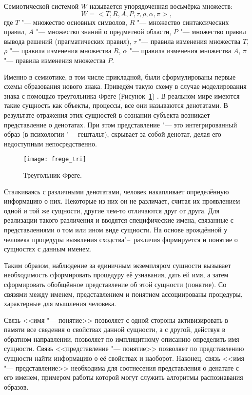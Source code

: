 \begin{Def}
	Семиотической системой $W$ называется упорядоченная восьмёрка множеств:
	\begin{equation}
		W=<T,R,A,P,\tau,\rho,\alpha,\pi>,
	\end{equation} 
	где	$T$ "--- множество основных символов, $R$ "--- множество синтаксических правил, $A$ "--- множество знаний о предметной области, $P$ "--- множество правил вывода решений (прагматических правил), $\tau$ "--- правила изменения множества $T$, $\rho$ "--- правила изменения множества $R$, $\alpha$ "--- правила изменения множества $A$, $\pi$ "--- правила изменения множества $P$.
\end{Def}

Именно в семиотике, в том числе прикладной, были сформулированы первые схемы образования нового знака. Приведём такую схему в случае моделирования знака с помощью треугольника Фреге (Рисунок~\ref{fg:frege_sign}) \cite{Frege2000,Pirs2000}. В реальном мире имеются такие сущность как объекты, процессы, все они называются денотатами. В результате отражения этих сущностей в сознании субъекта возникает представление о денотатах. При этом представление "--- это интегрированный образ (в психологии "--- гештальт), скрывает за собой денотат, делая его недоступным непосредственно.

\begin{figure}[h]
	\centering
	\texttt{[image: frege\_tri]}
	\caption{Треугольник Фреге.}
	\label{fg:frege_sign}
\end{figure}

Сталкиваясь с различными денотатами, человек накапливает определённую информацию о них. Некоторые из них он не различает, считая их проявлением одной и той же сущности, другие чем-то отличаются друг от друга. Для реализации такого различения и вводятся специфические имена, связанные с представлениями о том или ином виде сущности. На основе врождённой у человека процедуры выявления сходства"--~различия формируется и понятие о сущностях с данным именем.

Таким образом, наблюдение за единичным экземпляром сущности вызывает необходимость сформировать процедуру её узнавания, дать ей имя, а затем сформировать обобщённое представление об этой сущности (понятие). Со связями между именем, представлением и понятием ассоциированы процедуры, характерные для мышления человека.

Связь <<имя "--- понятие>> позволяет с одной стороны активизировать в памяти все сведения о свойствах данной сущности, а с другой, действуя в обратном направлении, позволяет по имплицитному описанию определить имя сущности. Связь <<представление "--- понятие>> позволяет по представлению сущности найти информацию о её свойствах и наоборот. Наконец, связь <<имя "--- представление>> необходима для соотнесения представления о денатате с его именем, примером работы которой могут служить алгоритмы распознавания образов.

